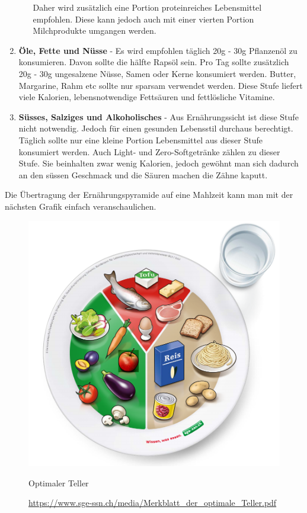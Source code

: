 \begin{enumerate}
\begin{enumerate}
    Daher wird zusätzlich eine Portion proteinreiches Lebensmittel empfohlen. Diese kann jedoch auch mit einer vierten Portion Milchprodukte umgangen werden. \cite{stufe_fleisch_fisch_eier_tofu_2}
  \end{enumerate}
  \item \textbf{Öle, Fette und Nüsse} - Es wird empfohlen täglich 20g - 30g Pflanzenöl zu konsumieren. Davon sollte die hälfte Rapsöl sein. Pro Tag sollte zusätzlich 20g - 30g ungesalzene Nüsse, Samen oder Kerne konsumiert werden. 
  \newline
  Butter, Margarine, Rahm etc sollte nur sparsam verwendet werden.
  \newline
  Diese Stufe liefert viele Kalorien, lebensnotwendige Fettsäuren und fettlösliche Vitamine. \cite{stufe_le_fette_nuesse}
  \item \textbf{Süsses, Salziges und Alkoholisches} - Aus Ernährungssicht ist diese Stufe nicht notwendig. Jedoch für einen gesunden Lebensstil durchaus berechtigt. 
  Täglich sollte nur eine kleine Portion Lebensmittel aus dieser Stufe konsumiert werden.
  Auch Light- und Zero-Softgetränke zählen zu dieser Stufe. Sie beinhalten zwar wenig Kalorien, jedoch gewöhnt man sich dadurch an den süssen Geschmack und die Säuren machen die Zähne kaputt. \cite{stufe_suesses_salziges_alkoholisches}
\end{enumerate}
Die Übertragung der Ernährungspyramide auf eine Mahlzeit kann man mit der nächsten Grafik einfach veranschaulichen.
\newline
\begin{figure}[!hbpt]
  \centering
  \includegraphics[width=0.5\linewidth]{./images/der_perfekte_teller.png}
  \caption{Optimaler Teller}
  \label{fig:teller}
  \caption*{\url{https://www.sge-ssn.ch/media/Merkblatt_der_optimale_Teller.pdf}}
\end{figure}
\newline
